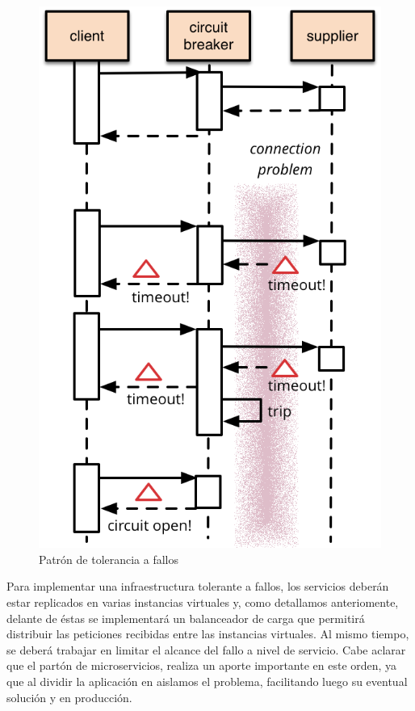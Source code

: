 \begin{figure}[H]
  \includegraphics[width=\linewidth]{src/images/04-capitulo-4/circuit_breaker.png}
  \caption{Patrón de tolerancia a fallos }
  \label{fig:circuit_breaker}
\end{figure}

Para implementar una infraestructura tolerante a fallos, los servicios deberán estar replicados en varias instancias virtuales y, como detallamos anteriomente, delante de éstas se implementará un balanceador de carga que permitirá distribuir las peticiones recibidas entre las instancias virtuales.  Al mismo tiempo, se deberá trabajar en limitar el alcance del fallo a nivel de servicio.  Cabe aclarar que el partón de microservicios, realiza un aporte importante en este orden, ya que al dividir la aplicación en  aislamos el problema, facilitando luego su eventual solución y  en producción.

